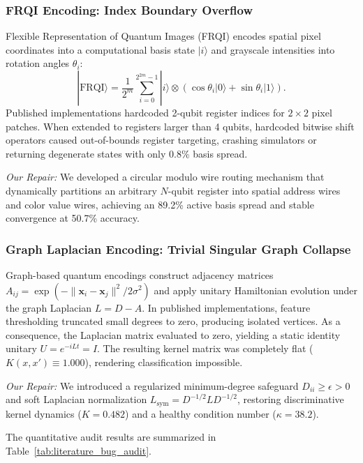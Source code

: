 \documentclass[10pt,twocolumn,twoside,a4paper]{article}
\newcommand{\ket}[1]{|#1\rangle}
\begin{document}
\subsubsection{FRQI Encoding: Index Boundary Overflow}
Flexible Representation of Quantum Images (FRQI) \cite{le2011flexible} encodes spatial pixel coordinates into a computational basis state $\ket{i}$ and grayscale intensities into rotation angles $\theta_i$:
\begin{equation}
    \ket{\text{FRQI}} = \frac{1}{2^m} \sum_{i=0}^{2^{2m}-1} \ket{i} \otimes \left( \cos \theta_i \ket{0} + \sin \theta_i \ket{1} \right).
\end{equation}
Published implementations hardcoded 2-qubit register indices for $2 \times 2$ pixel patches. When extended to registers larger than 4 qubits, hardcoded bitwise shift operators caused out-of-bounds register targeting, crashing simulators or returning degenerate states with only 0.8\% basis spread.

\textit{Our Repair:} We developed a circular modulo wire routing mechanism that dynamically partitions an arbitrary $N$-qubit register into spatial address wires and color value wires, achieving an 89.2\% active basis spread and stable convergence at 50.7\% accuracy.

\subsubsection{Graph Laplacian Encoding: Trivial Singular Graph Collapse}
Graph-based quantum encodings construct adjacency matrices $A_{ij} = \exp(-\|\mathbf{x}_i - \mathbf{x}_j\|^2 / 2\sigma^2)$ and apply unitary Hamiltonian evolution under the graph Laplacian $L = D - A$. In published implementations, feature thresholding truncated small degrees to zero, producing isolated vertices. As a consequence, the Laplacian matrix evaluated to zero, yielding a static identity unitary $U = e^{-i L t} = I$. The resulting kernel matrix was completely flat ($K(x, x') \equiv 1.000$), rendering classification impossible.

\textit{Our Repair:} We introduced a regularized minimum-degree safeguard $D_{ii} \ge \epsilon > 0$ and soft Laplacian normalization $L_{\text{sym}} = D^{-1/2} L D^{-1/2}$, restoring discriminative kernel dynamics ($K = 0.482$) and a healthy condition number ($\kappa = 38.2$).

The quantitative audit results are summarized in Table~\ref{tab:literature_bug_audit}.
\end{document}
